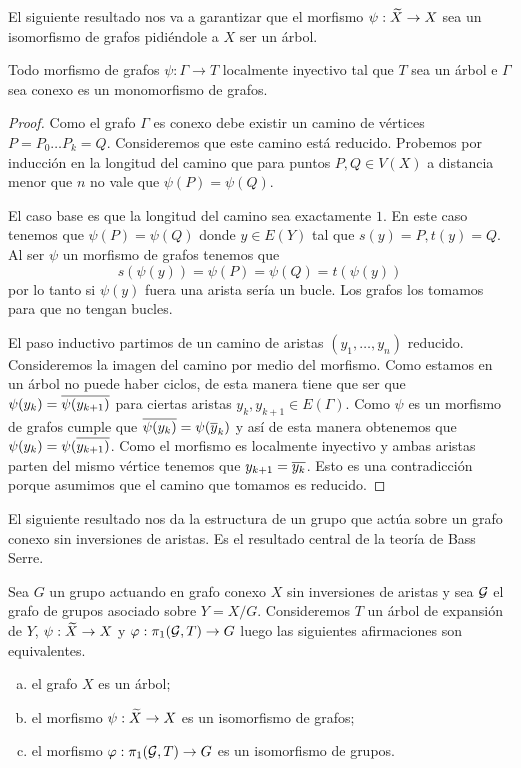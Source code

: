 \documentclass[tesis.tex]{subfiles}
\begin{document}
El siguiente resultado nos va a garantizar que el morfismo $\psi: \widetilde X \to X$ sea un isomorfismo de grafos pidiéndole a $X$ ser un árbol.

\begin{prop}\label{prop_loc_iny}
	Todo morfismo de grafos $\psi:\Gamma \to T$ localmente inyectivo tal que $T$ sea un árbol e $\Gamma$ sea conexo es un monomorfismo de grafos.    
\end{prop}
\begin{proof}
	Como el grafo $\Gamma$ es conexo debe existir un camino de vértices $P=P_0 \dots P_k=Q$.
	Consideremos que este camino está reducido.
	Probemos por inducción en la longitud del camino que para puntos $P,Q \in V(X)$ a distancia menor que $n$ no vale que $\psi(P) = \psi(Q)$.
	
	El caso base es que la longitud del camino sea exactamente $1$.
	En este caso tenemos que $\psi(P) = \psi(Q)$ donde $y \in E(Y)$ tal que $s(y)= P, t(y) = Q$.
	Al ser $\psi$ un morfismo de grafos tenemos que 
	\begin{equation*}
		s(\psi(y)) = \psi(P) = \psi (Q) = t(\psi(y))
	\end{equation*}
	por lo tanto si $\psi(y)$ fuera una arista sería un bucle.
	Los grafos los tomamos para que no tengan bucles.
	
	El paso inductivo partimos de un camino de aristas $(y_1, \dots, y_n)$ reducido.
	Consideremos la imagen del camino por medio del morfismo.
	Como estamos en un árbol no puede haber ciclos, de esta manera tiene que ser que $\psi(y_k) = \overline{\psi (y_{k+1})}$ para ciertas aristas $y_k, y_{k+1} \in E(\Gamma)$.
	Como $\psi$ es un morfismo de grafos cumple que $\overline {\psi(y_k)} = \psi(\overline y_k)$ y así de esta manera obtenemos que $\psi(y_k) =  \psi(\overline{y_{k+1})}$.
	Como el morfismo es localmente inyectivo y ambas aristas parten del mismo vértice tenemos que $y_{k+1} = \overline{y_k}$. Esto es una contradicción porque asumimos que el camino que tomamos es reducido.    
\end{proof}

El siguiente resultado nos da la estructura de un grupo que actúa sobre un grafo conexo sin inversiones de aristas. 
Es el resultado central de la teoría de Bass Serre.

\begin{teo}\label{teo_Serre}
	Sea $G$ un grupo actuando en grafo conexo $X$ sin inversiones de aristas y sea $\cal G$ el grafo de grupos asociado sobre $Y = X / G$.
	Consideremos $T$ un árbol de expansión de $Y$, $\psi: \widetilde X \to X$ y $\varphi: \pi_1({\cal G}, T) \to G$ luego las siguientes afirmaciones son equivalentes.
	\begin{enumerate}[(a)]
		\item el grafo $X$ es un árbol;
		\item el morfismo $\psi: \widetilde X \to X$ es un isomorfismo de grafos;
		\item el morfismo $\varphi:\pi_1({\cal G}, T) \to G$ es un isomorfismo de grupos.
	\end{enumerate}
\end{teo}
\end{document}
